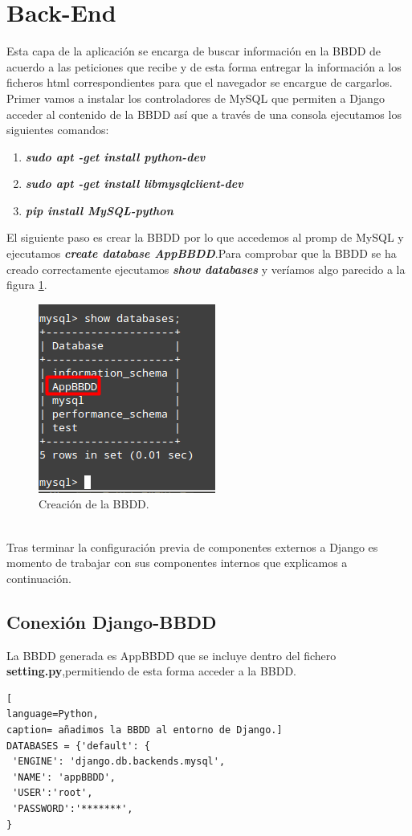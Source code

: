 \section{Back-End}
Esta capa de la aplicación se encarga de buscar información en la BBDD de acuerdo a las peticiones que recibe y de esta forma entregar la información a los ficheros html correspondientes para que el navegador se encargue de cargarlos.
\\Primer vamos a instalar los controladores de MySQL que permiten a Django acceder al contenido de la BBDD así que a través de una consola ejecutamos los siguientes comandos:
\begin{enumerate}
\item \textbf{\textit{sudo apt -get install python-dev}}
\item \textbf{\textit{sudo apt -get install libmysqlclient-dev}}
\item \textbf{\textit{pip install MySQL-python}}
\end{enumerate}
El siguiente paso es crear la BBDD por lo que accedemos al promp de MySQL y ejecutamos \textit{\textbf{create database AppBBDD}}.Para comprobar que la BBDD se ha creado correctamente ejecutamos \textbf{\textit{show databases}} y veríamos algo parecido a la figura \ref{fig:Creacion_BBDD_APP}.
\begin{figure}[!h]
\begin{center}
   \includegraphics[width=0.2\linewidth]{Figures/Create_Databases}
	\decoRule
	\caption[Create BBDD]{Creación de la BBDD.}
\label{fig:Creacion_BBDD_APP}
\end{center}
\end{figure}
\\Tras terminar la configuración previa de componentes externos a Django es momento de trabajar con sus componentes internos que explicamos a continuación.
\subsection{Conexión Django-BBDD}
La BBDD generada es AppBBDD que se incluye dentro del fichero \textbf{setting.py},permitiendo de esta forma acceder a la BBDD.
\begin{lstlisting}[
language=Python,
caption= añadimos la BBDD al entorno de Django.]
DATABASES = {'default': {
 'ENGINE': 'django.db.backends.mysql',
 'NAME': 'appBBDD',
 'USER':'root',
 'PASSWORD':'*******',
}
\end{lstlisting}
